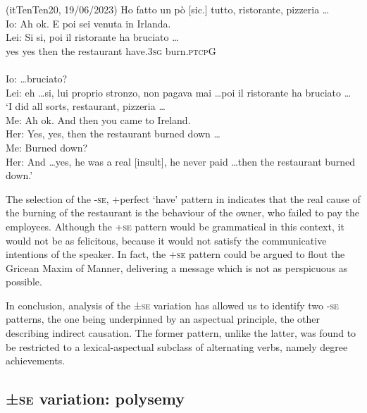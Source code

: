 \documentclass[output=paper,colorlinks,citecolor=brown
]{langscibook}
\begin{document}
\hspace*{\fill}(itTenTen20, 19/06/2023)\quad
\ea \label{bentley_example_34}
    Ho fatto un pò [sic.] tutto, ristorante, pizzeria \ldots  \\
    Io: Ah ok. E poi sei venuta in Irlanda. \\
    \gll Lei: Si			si,			poi			il		ristorante	ha						bruciato  \ldots    \\
    {} yes		yes		then		the	restaurant	have.3\textsc{sg}	burn.\textsc{ptcp}G {} \\ \\
    {Io:  \ldots bruciato?  }\\
    {Lei: eh \ldots si, lui proprio stronzo, non pagava mai \ldots  poi il ristorante ha bruciato \ldots } \\
    \glt 	‘I did all sorts, restaurant, pizzeria \ldots  \\
            Me:	Ah ok. And then you came to Ireland. \\
            Her:	Yes, yes, then the restaurant burned down \ldots  \\
            Me:	Burned down? \\
            		Her:	And \ldots  yes, he was a real [insult], he never paid \ldots  then the restaurant burned down.’
\z
   

The selection of the {-\textsc{se}, +perfect ‘have’} pattern in  indicates that the real cause of the burning of the restaurant is the behaviour of the owner, who failed to pay the employees. Although the +\textsc{se} pattern would be grammatical in this context, it would not be as felicitous, because it would not satisfy the communicative intentions of the speaker. In fact, the +\textsc{se} pattern could be argued to flout the Gricean Maxim of Manner, delivering a message which is not as perspicuous as possible.

In conclusion, analysis of the ±\textsc{se} variation has allowed us to identify two -\textsc{se} patterns, the one being underpinned by an aspectual principle, the other describing indirect causation. The former pattern, unlike the latter, was found to be restricted to a lexical-aspectual subclass of alternating verbs, namely degree achievements.

\subsection{±\textsc{se} variation: polysemy}
\label{bentley_section_4.3}
\end{document}
